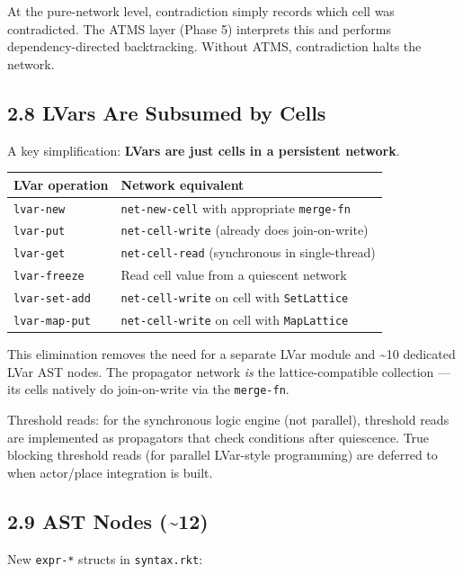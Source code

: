 \documentclass[11pt]{article}
\begin{document}
At the pure-network level, contradiction simply records which cell was
contradicted. The ATMS layer (Phase 5) interprets this and performs
dependency-directed backtracking. Without ATMS, contradiction halts the
network.
\subsection{2.8 LVars Are Subsumed by Cells}
\label{sec:orgabd958e}

A key simplification: \textbf{LVars are just cells in a persistent network}.

\begin{center}
\begin{tabular}{ll}
LVar operation & Network equivalent\\
\hline
\texttt{lvar-new} & \texttt{net-new-cell} with appropriate \texttt{merge-fn}\\
\texttt{lvar-put} & \texttt{net-cell-write} (already does join-on-write)\\
\texttt{lvar-get} & \texttt{net-cell-read} (synchronous in single-thread)\\
\texttt{lvar-freeze} & Read cell value from a quiescent network\\
\texttt{lvar-set-add} & \texttt{net-cell-write} on cell with \texttt{SetLattice}\\
\texttt{lvar-map-put} & \texttt{net-cell-write} on cell with \texttt{MapLattice}\\
\end{tabular}
\end{center}

This elimination removes the need for a separate LVar module and \textasciitilde{}10
dedicated LVar AST nodes. The propagator network \emph{is} the lattice-compatible
collection — its cells natively do join-on-write via the \texttt{merge-fn}.

Threshold reads: for the synchronous logic engine (not parallel), threshold
reads are implemented as propagators that check conditions after quiescence.
True blocking threshold reads (for parallel LVar-style programming) are
deferred to when actor/place integration is built.
\subsection{2.9 AST Nodes (\textasciitilde{}12)}
\label{sec:orgf5c5107}

New \texttt{expr-*} structs in \texttt{syntax.rkt}:
\end{document}
